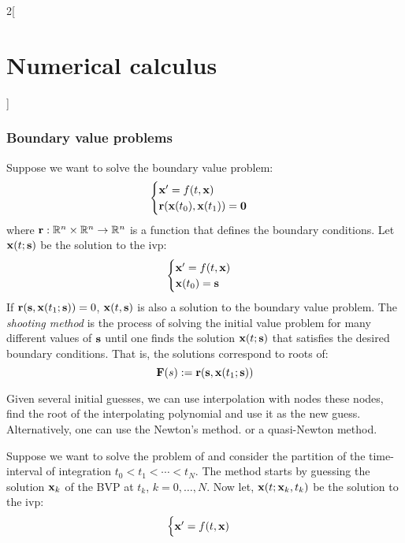 \documentclass[../../../main_math.tex]{subfiles}
\begin{document}
\begin{multicols}{2}[\section{Numerical calculus}]
  \subsubsection{Boundary value problems}
  \begin{definition}
    Suppose we want to solve the boundary value problem:
    \begin{equation}\label{NC:bvp}
      \begin{cases}
        \boldsymbol{\mathrm{x}}' =f(t, \boldsymbol{\mathrm{x}}) \\
        \boldsymbol{\mathrm{r}}(\boldsymbol{\mathrm{x}}(t_0), \boldsymbol{\mathrm{x}}(t_1))=\boldsymbol{\mathrm{0}}
      \end{cases}
    \end{equation}
    where $\boldsymbol{\mathrm{r}}: \mathbb{R}^n\times\mathbb{R}^n\rightarrow\mathbb{R}^n$ is a function that defines the boundary conditions.
    Let $\boldsymbol{\mathrm{x}}(t;\boldsymbol{\mathrm{s}})$ be the solution to the ivp:
    \begin{equation*}
      \begin{cases}
        \boldsymbol{\mathrm{x}}' =f(t, \boldsymbol{\mathrm{x}}) \\
        \boldsymbol{\mathrm{x}}(t_0)=\boldsymbol{\mathrm{s}}
      \end{cases}
    \end{equation*}
    If $\boldsymbol{\mathrm{r}}(\boldsymbol{\mathrm{s}}, \boldsymbol{\mathrm{x}}(t_1;\boldsymbol{\mathrm{s}}))=0$, $\boldsymbol{\mathrm{x}}(t,\boldsymbol{\mathrm{s}})$ is also a solution to the boundary value problem. The \emph{shooting method} is the process of solving the initial value problem for many different values of $\boldsymbol{\mathrm{s}}$ until one finds the solution $\boldsymbol{\mathrm{x}}(t;\boldsymbol{\mathrm{s}})$ that satisfies the desired boundary conditions. That is, the solutions correspond to roots of:
    $$
      \boldsymbol{\mathrm{F}}(s):=\boldsymbol{\mathrm{r}}(\boldsymbol{\mathrm{s}},\boldsymbol{\mathrm{x}}(t_1;\boldsymbol{\mathrm{s}}))
    $$
  \end{definition}
  \begin{remark}
    Given several initial guesses, we can use interpolation with nodes these nodes, find the root of the interpolating polynomial and use it as the new guess. Alternatively, one can use the Newton's method. or a quasi-Newton method.
  \end{remark}
  \begin{definition}
    Suppose we want to solve the problem of  and consider the partition of the time-interval of integration $t_0<t_1<\cdots<t_N$. The method starts by guessing the solution $\boldsymbol{\mathrm{x}}_k$ of the BVP at $t_k$, $k=0,\ldots,N$. Now let, $\boldsymbol{\mathrm{x}}(t;\boldsymbol{\mathrm{x}}_k,t_k)$ be the solution to the ivp:
    \begin{equation*}
      \begin{cases}
        \boldsymbol{\mathrm{x}}' =f(t, \boldsymbol{\mathrm{x}}) \\

\end{cases}
\end{equation*}
\end{definition}
\end{multicols}
\end{document}
